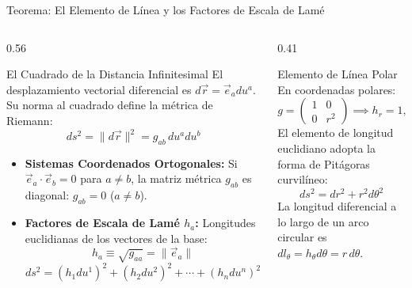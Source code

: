 \documentclass[10pt,aspectratio=169]{beamer}
\begin{document}
\begin{frame}{Teorema: El Elemento de Línea y los Factores de Escala de Lamé}
  \begin{columns}[c]
    \begin{column}{0.56\textwidth}
      \footnotesize
      \begin{block}{El Cuadrado de la Distancia Infinitesimal}
        El desplazamiento vectorial diferencial es $d\vec{r} = \vec{e}_a du^a$. Su norma al cuadrado define la métrica de Riemann:
        \[
        \boxed{ds^2 = \|d\vec{r}\|^2 = g_{ab}\, du^a du^b}
        \]
      \end{block}
      \begin{itemize}\itemsep2pt
        \item \textbf{Sistemas Coordenados Ortogonales:}
        Si $\vec{e}_a \cdot \vec{e}_b = 0$ para $a \neq b$, la matriz métrica $g_{ab}$ es diagonal: $g_{ab} = 0$ ($a \neq b$).
        \item \textbf{Factores de Escala de Lamé $h_a$:}
        Longitudes euclidianas de los vectores de la base:
        \[
        \boxed{h_a \equiv \sqrt{g_{aa}} = \|\vec{e}_a\|}
        \]
        \[
        ds^2 = (h_1 du^1)^2 + (h_2 du^2)^2 + \cdots + (h_n du^n)^2
        \]
      \end{itemize}
    \end{column}
    \begin{column}{0.41\textwidth}
      \footnotesize
      \begin{block}{Elemento de Línea Polar}
        \scriptsize
        En coordenadas polares:
        \[
        g = \begin{pmatrix} 1 & 0 \\ 0 & r^2 \end{pmatrix} \implies h_r = 1, \; h_\theta = r.
        \]
        El elemento de longitud euclidiano adopta la forma de Pitágoras curvilíneo:
        \[
        \boxed{ds^2 = dr^2 + r^2 d\theta^2}
        \]
        La longitud diferencial a lo largo de un arco circular es $dl_\theta = h_\theta d\theta = r\, d\theta$.
      \end{block}
    \end{column}
  \end{columns}
\end{frame}
\end{document}
